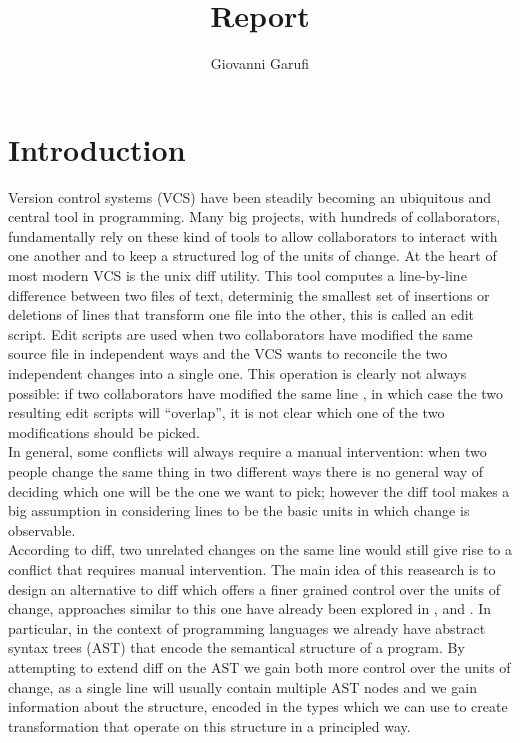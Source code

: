 \documentclass[11pt]{article}
\title{Report}
\author{Giovanni Garufi}
\date{}
\begin{document}
\maketitle

\section{Introduction}
Version control systems (VCS) have been steadily becoming an ubiquitous and central 
tool in programming. Many big projects, with hundreds of collaborators, 
fundamentally rely on these kind of tools to allow collaborators to interact 
with one another and to keep a structured log of the units of change. 
At the heart of most modern VCS is the unix diff utility. This tool computes a 
line-by-line difference between two files of text, determinig the smallest set 
of insertions or deletions of lines that transform one file into the other, this is called an edit script. 
Edit scripts are used when two collaborators have modified the same source file in independent 
ways and the VCS wants to reconcile the two independent changes into a single 
one. This operation is clearly not always possible: if two collaborators have 
modified the same line , in which case the two resulting edit scripts will 
``overlap'', it is not clear which one of the two modifications should be 
picked.  \\
In general, some conflicts will always require a manual intervention: when two 
people change the same thing in two different ways there is no general way of 
deciding which one will be the one we want to pick; however the diff tool makes 
a big assumption in considering lines to be the basic units in which change is 
observable.  \\
According to diff, two unrelated changes on the same line would still give rise to a 
conflict that requires manual intervention. 
The main idea of this reasearch is to design an alternative to diff which offers a 
finer grained control over the units of change, approaches similar to this one have already been explored in 
\cite{semantics-VC}, \cite{structure-aware-VC} and \cite{vassena}. In particular, in the context of 
programming languages we already have abstract syntax trees (AST) that encode 
the semantical structure of a program. By attempting to extend diff on the AST 
we gain both more control over the units of change, as a single line will 
usually contain multiple AST nodes and we gain information about the structure, encoded in the types which 
we can use to create transformation that operate on this structure in a principled way. 
\end{document}
